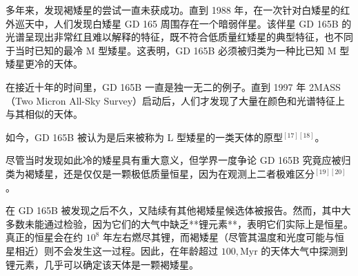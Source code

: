 多年来，发现褐矮星的尝试一直未获成功。直到 1988 年，在一次针对白矮星的红外巡天中，人们发现白矮星 GD 165 周围存在一个暗弱伴星。该伴星 GD 165B 的光谱呈现出非常红且难以解释的特征，既不符合低质量红矮星的典型特征，也不同于当时已知的最冷 M 型矮星。这表明，GD 165B 必须被归类为一种比已知 M 型矮星更冷的天体。

在接近十年的时间里，GD 165B 一直是独一无二的例子。直到 1997 年 2MASS（Two Micron All-Sky Survey）启动后，人们才发现了大量在颜色和光谱特征上与其相似的天体。

如今，GD 165B 被认为是后来被称为 L 型矮星的一类天体的原型$^{[17][18]}$。

尽管当时发现如此冷的矮星具有重大意义，但学界一度争论 GD 165B 究竟应被归类为褐矮星，还是仅仅是一颗极低质量恒星，因为在观测上二者极难区分$^{[19][20]}$。

在 GD 165B 被发现之后不久，又陆续有其他褐矮星候选体被报告。然而，其中大多数未能通过检验，因为它们的大气中缺乏**锂元素**，表明它们实际上是恒星。真正的恒星会在约 $10^8$ 年左右燃尽其锂，而褐矮星（尽管其温度和光度可能与恒星相近）则不会发生这一过程。因此，在年龄超过 $100,\mathrm{Myr}$ 的天体大气中探测到锂元素，几乎可以确定该天体是一颗褐矮星。
